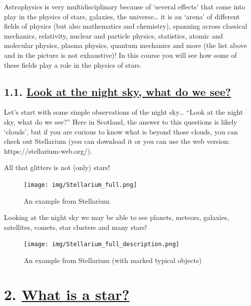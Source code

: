 \documentclass[
  letterpaper,
  DIV=11,
  numbers=noendperiod]{scrartcl}
\begin{document}
Astrophysics is very multidisciplinary because of `several effects' that
come into play in the physics of stars, galaxies, the universe\ldots{}
it is an `arena' of different fields of physics (but also mathematics
and chemistry), spanning across classical mechanics, relativity, nuclear
and particle physics, statistics, atomic and molecular physics, plasma
physics, quantum mechanics and more (the list above and in the picture
is not exhaustive)! In this course you will see how some of these fields
play a role in the physics of stars.

\hypertarget{look-at-the-night-sky-what-do-we-see}{%
\subsection{\texorpdfstring{1.1. \protect\hyperlink{toc0_}{Look at the
night sky, what do we
see?}}{1.1. Look at the night sky, what do we see?}}\label{look-at-the-night-sky-what-do-we-see}}

Let's start with some simple observations of the night sky\ldots{}
``Look at the night sky, what do we see?'' Here in Scotland, the answer
to this questions is likely `clouds', but if you are curious to know
what is beyond those clouds, you can check out Stellarium (you can
download it or you can use the web version:
https://stellarium-web.org/).

All that glitters is not (only) stars!

\begin{figure}

{\centering \texttt{[image: img/Stellarium\_full.png]}

}

\caption{An example from Stellarium}

\end{figure}

Looking at the night sky we may be able to see planets, meteors,
galaxies, satellites, comets, star clusters and many stars!

\begin{figure}

{\centering \texttt{[image: img/Stellarium\_full\_description.png]}

}

\caption{An example from Stellarium (with marked typical objects)}

\end{figure}

\hypertarget{what-is-a-star}{%
\section{\texorpdfstring{2. \protect\hyperlink{toc0_}{What is a
star?}}{2. What is a star?}}\label{what-is-a-star}}
\end{document}
